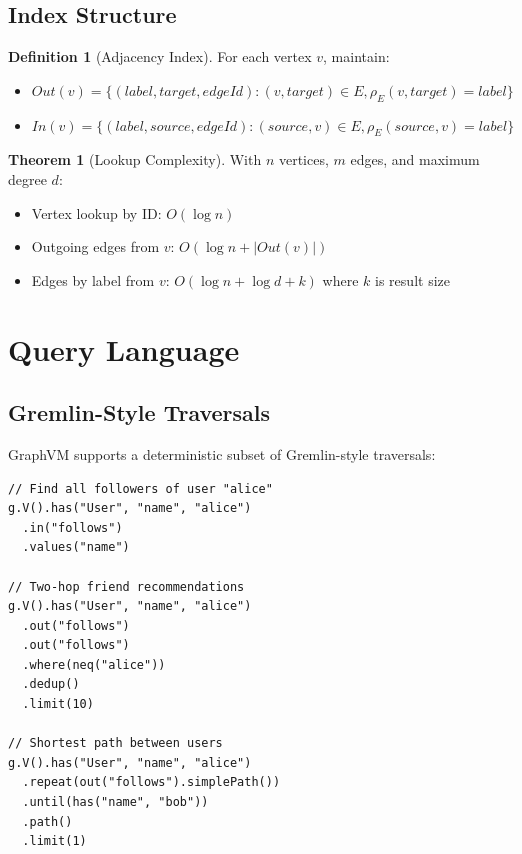 \documentclass[11pt,a4paper]{article}
\theoremstyle{definition}
\newtheorem{definition}{Definition}
\newtheorem{theorem}{Theorem}
\begin{document}
\subsection{Index Structure}

\begin{definition}[Adjacency Index]
For each vertex $v$, maintain:
\begin{itemize}
    \item $Out(v) = \{(label, target, edgeId) : (v, target) \in E, \rho_E(v, target) = label\}$
    \item $In(v) = \{(label, source, edgeId) : (source, v) \in E, \rho_E(source, v) = label\}$
\end{itemize}
\end{definition}

\begin{theorem}[Lookup Complexity]
With $n$ vertices, $m$ edges, and maximum degree $d$:
\begin{itemize}
    \item Vertex lookup by ID: $O(\log n)$
    \item Outgoing edges from $v$: $O(\log n + |Out(v)|)$
    \item Edges by label from $v$: $O(\log n + \log d + k)$ where $k$ is result size
\end{itemize}
\end{theorem}

\section{Query Language}

\subsection{Gremlin-Style Traversals}

GraphVM supports a deterministic subset of Gremlin-style traversals:

\begin{lstlisting}
// Find all followers of user "alice"
g.V().has("User", "name", "alice")
  .in("follows")
  .values("name")

// Two-hop friend recommendations
g.V().has("User", "name", "alice")
  .out("follows")
  .out("follows")
  .where(neq("alice"))
  .dedup()
  .limit(10)

// Shortest path between users
g.V().has("User", "name", "alice")
  .repeat(out("follows").simplePath())
  .until(has("name", "bob"))
  .path()
  .limit(1)
\end{lstlisting}
\end{document}
